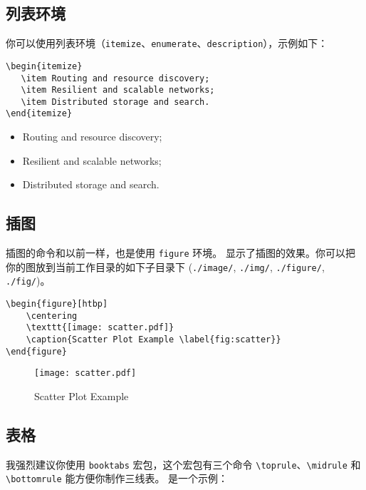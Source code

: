 \documentclass[lang=cn,11pt]{elegantpaper}
\begin{document}
\subsection{列表环境}
你可以使用列表环境（\lstinline{itemize}、\lstinline{enumerate}、\lstinline{description}），示例如下：\\[2ex]
\begin{minipage}[c]{0.59\linewidth}
\begin{lstlisting}
\begin{itemize}
   \item Routing and resource discovery;
   \item Resilient and scalable networks;
   \item Distributed storage and search.
\end{itemize}
\end{lstlisting}
\end{minipage}
\begin{minipage}[c]{0.4\linewidth}
\begin{itemize}
   \item Routing and resource discovery;
   \item Resilient and scalable networks;
   \item Distributed storage and search.
\end{itemize}
\end{minipage}




\subsection{插图}
插图的命令和以前一样，也是使用 \lstinline{figure} 环境。 显示了插图的效果。你可以把你的图放到当前工作目录的如下子目录下 (\lstinline{./image/}, \lstinline{./img/}, \lstinline{./figure/}, \lstinline{./fig/})。


\begin{lstlisting}
\begin{figure}[htbp]
	\centering
	\texttt{[image: scatter.pdf]}
	\caption{Scatter Plot Example \label{fig:scatter}}
\end{figure}
\end{lstlisting}
\begin{figure}[htbp]
	\centering
	\texttt{[image: scatter.pdf]}
	\caption{Scatter Plot Example \label{fig:scatter}}
\end{figure}

\subsection{表格}
我强烈建议你使用 \lstinline{booktabs} 宏包，这个宏包有三个命令 \lstinline{\toprule}、\lstinline{\midrule} 和 \lstinline{\bottomrule} 能方便你制作三线表。 是一个示例：
\end{document}
